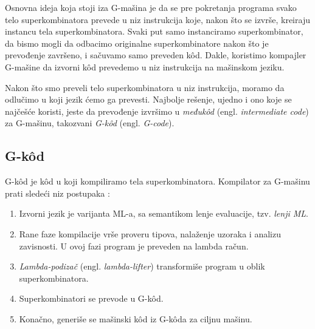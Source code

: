 Osnovna ideja koja stoji iza G-mašina je da se pre pokretanja programa svako telo superkombinatora prevede u niz instrukcija koje, nakon što se izvrše, kreiraju instancu tela superkombinatora. Svaki put samo instanciramo superkombinator, da bismo mogli da odbacimo originalne superkombinatore nakon što je prevođenje završeno, i sačuvamo samo preveden k\^ od. Dakle, koristimo kompajler G-mašine da izvorni k\^ od prevedemo u niz instrukcija na mašinskom jeziku.

Nakon što smo preveli telo superkombinatora u niz instrukcija, moramo da odlučimo u koji jezik ćemo ga prevesti. Najbolje rešenje, ujedno i ono koje se najčešće koristi, jeste da prevođenje izvršimo u \textit{međuk\^ od} (engl. \textit{intermediate code}) za G-mašinu, takozvani {\em G-k\^ od} (engl. \textit{G-code}).

\subsection{G-k\^ od}

G-k\^ od je k\^ od u koji kompiliramo tela superkombinatora. Kompilator za G-mašinu prati sledeći niz postupaka \cite{the-implementation-of-functional-programming-languages, abstract-machines}:

\begin{enumerate}
	\item Izvorni jezik je varijanta ML-a, sa semantikom lenje evaluacije, tzv. {\em lenji ML}.
	\item Rane faze kompilacije vrše proveru tipova, nalaženje uzoraka i analizu zavisnosti. U ovoj fazi program je preveden na lambda račun.
	\item \textit{Lambda-podizač} (engl. \textit{lambda-lifter}) transformiše program u oblik superkombinatora.   
	\item Superkombinatori se prevode u G-k\^ od.
	\item Konačno, generiše se mašinski k\^ od iz G-k\^ oda za ciljnu mašinu.
\end{enumerate}

